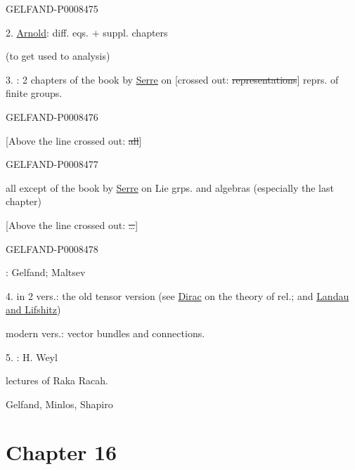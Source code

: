 \begin{GelfandAdjacentEvidence}{GELFAND-P000847}{5}


2. \uline{Arnold}: diff. eqs. \(+\) suppl. chapters

(to get used to analysis)

3. : 2 chapters of the book by \uline{Serre} on
[crossed out: \sout{representations}] reprs. of finite groups.
\end{GelfandAdjacentEvidence}
\begin{GelfandAdjacentEvidence}{GELFAND-P000847}{6}


[Above the line crossed out: \sout{all}]
\end{GelfandAdjacentEvidence}
\begin{GelfandAdjacentEvidence}{GELFAND-P000847}{7}


all except  of the book by \uline{Serre} on Lie grps. and algebras
(especially the last chapter)

[Above the line crossed out: \sout{…}]
\end{GelfandAdjacentEvidence}
\begin{GelfandAdjacentEvidence}{GELFAND-P000847}{8}


: Gelfand; Maltsev

4.  in 2 vers.: the old tensor version
(see \uline{Dirac} on the theory of rel.; and \uline{Landau and Lifshitz})
\end{GelfandAdjacentEvidence}


modern vers.: vector bundles and connections.

5. : H. Weyl

lectures of Raka \quad Racah.

Gelfand, Minlos, Shapiro


\clearpage
{}
\section*{Chapter 16}


